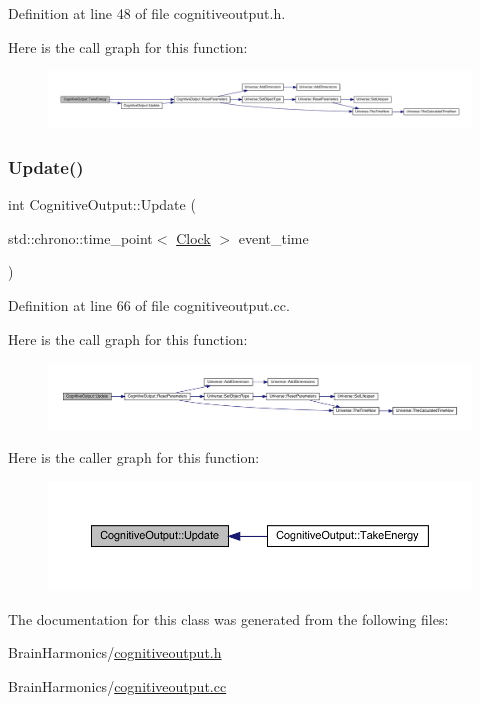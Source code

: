 Definition at line 48 of file cognitiveoutput.\+h.

Here is the call graph for this function\+:
\nopagebreak
\begin{figure}[H]
\begin{center}
\leavevmode
\includegraphics[width=350pt]{class_cognitive_output_aae27d114676c68e02ae6e7ae36326ba8_cgraph}
\end{center}
\end{figure}
\mbox{\label{class_cognitive_output_a2b4d33c7a529402c684d828efd25095a}} 
\subsubsection{\texorpdfstring{Update()}{Update()}}
{\footnotesize\ttfamily int Cognitive\+Output\+::\+Update (\begin{DoxyParamCaption}\item[{std\+::chrono\+::time\+\_\+point$<$ \hyperlink{universe_8h_a0ef8d951d1ca5ab3cfaf7ab4c7a6fd80}{Clock} $>$}]{event\+\_\+time }\end{DoxyParamCaption})}



Definition at line 66 of file cognitiveoutput.\+cc.

Here is the call graph for this function\+:
\nopagebreak
\begin{figure}[H]
\begin{center}
\leavevmode
\includegraphics[width=350pt]{class_cognitive_output_a2b4d33c7a529402c684d828efd25095a_cgraph}
\end{center}
\end{figure}
Here is the caller graph for this function\+:
\nopagebreak
\begin{figure}[H]
\begin{center}
\leavevmode
\includegraphics[width=350pt]{class_cognitive_output_a2b4d33c7a529402c684d828efd25095a_icgraph}
\end{center}
\end{figure}


The documentation for this class was generated from the following files\+:\begin{DoxyCompactItemize}
\item 
Brain\+Harmonics/\hyperlink{cognitiveoutput_8h}{cognitiveoutput.\+h}\item 
Brain\+Harmonics/\hyperlink{cognitiveoutput_8cc}{cognitiveoutput.\+cc}\end{DoxyCompactItemize}
